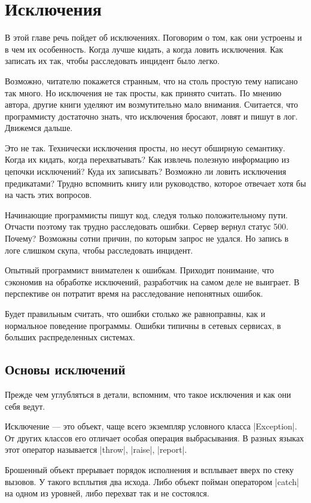 
\chapter{Исключения}

В этой главе речь пойдет об исключениях. Поговорим о том, как они устроены и в
чем их особенность. Когда лучше кидать, а когда ловить исключения. Как записать
их так, чтобы расследовать инцидент было легко.

Возможно, читателю покажется странным, что на столь простую тему написано так
много. Но исключения не так просты, как принято считать. По мнению автора,
другие книги уделяют им возмутительно мало внимания. Считается, что программисту
достаточно знать, что исключения бросают, ловят и пишут в лог. Движемся дальше.

Это не так. Технически исключения просты, но несут обширную семантику. Когда их
кидать, когда перехватывать? Как извлечь полезную информацию из цепочки
исключений? Куда их записывать? Возможно ли ловить исключения предикатами?
Трудно вспомнить книгу или руководство, которое отвечает хотя бы на часть этих
вопросов.

Начинающие программисты пишут код, следуя только положительному пути. Отчасти
поэтому так трудно расследовать ошибки. Сервер вернул статус 500. Почему?
Возможны сотни причин, по которым запрос не удался. Но запись в логе слишком
скупа, чтобы расследовать инцидент.

Опытный программист внимателен к ошибкам. Приходит понимание, что сэкономив на
обработке исключений, разработчик на самом деле не выиграет. В перспективе он
потратит время на расследование непонятных ошибок.

Будет правильным считать, что ошибки столько же равноправны, как и нормальное
поведение программы. Ошибки типичны в сетевых сервисах, в больших распределенных
системах.

\section{Основы исключений}

Прежде чем углубляться в детали, вспомним, что такое исключения и как они себя
ведут.

Исключение — это объект, чаще всего экземпляр условного класса \spverb|Exception|. От
других классов его отличает особая операция выбрасывания. В разных языках этот
оператор называется \spverb|throw|, \spverb|raise|, \spverb|report|.

Брошенный объект прерывает порядок исполнения и всплывает вверх по стеку
вызовов. У такого всплытия два исхода. Либо объект пойман оператором \spverb|catch| на
одном из уровней, либо перехват так и не состоялся.

